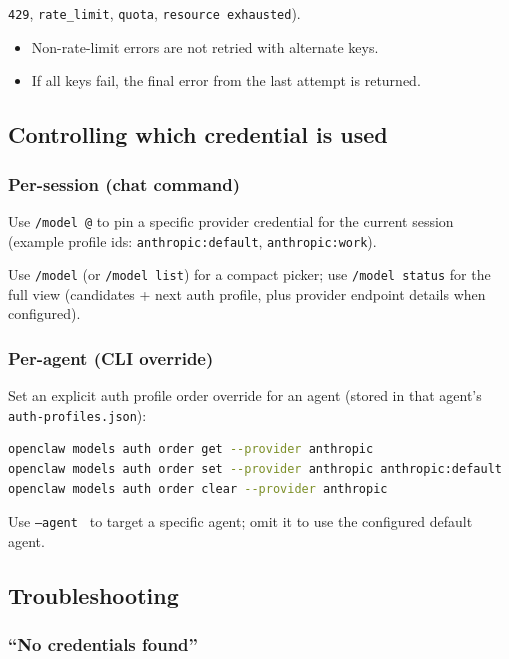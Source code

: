 \texttt{429}, \texttt{rate\_limit}, \texttt{quota}, \texttt{resource exhausted}).
\begin{itemize}
  \item Non-rate-limit errors are not retried with alternate keys.
  \item If all keys fail, the final error from the last attempt is returned.
\end{itemize}


\subsection{Controlling which credential is used}


\subsubsection{Per-session (chat command)}


Use \texttt{/model @} to pin a specific provider credential for the current session (example profile ids: \texttt{anthropic:default}, \texttt{anthropic:work}).

Use \texttt{/model} (or \texttt{/model list}) for a compact picker; use \texttt{/model status} for the full view (candidates + next auth profile, plus provider endpoint details when configured).

\subsubsection{Per-agent (CLI override)}


Set an explicit auth profile order override for an agent (stored in that agent’s \texttt{auth-profiles.json}):

\begin{lstlisting}[language=bash]
openclaw models auth order get --provider anthropic
openclaw models auth order set --provider anthropic anthropic:default
openclaw models auth order clear --provider anthropic
\end{lstlisting}


Use \texttt{--agent } to target a specific agent; omit it to use the configured default agent.

\subsection{Troubleshooting}


\subsubsection{“No credentials found”}


